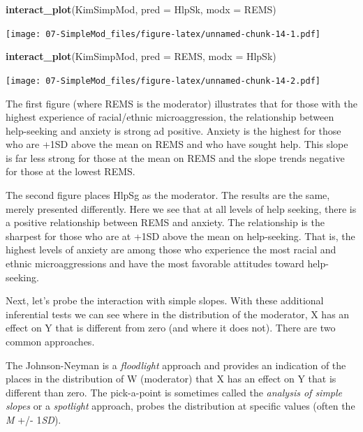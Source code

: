 \documentclass[
  11pt,
]{book}
\newenvironment{Shaded}{\begin{snugshade}}{\end{snugshade}}
\newcommand{\AttributeTok}[1]{\textcolor[rgb]{0.27,0.27,0.27}{#1}}
\newcommand{\FunctionTok}[1]{\textcolor[rgb]{0.27,0.27,0.27}{\textbf{#1}}}
\newcommand{\NormalTok}[1]{#1}
\begin{document}
\begin{Shaded}
\begin{Highlighting}[]
\FunctionTok{interact\_plot}\NormalTok{(KimSimpMod, }\AttributeTok{pred =}\NormalTok{ HlpSk, }\AttributeTok{modx =}\NormalTok{ REMS)}
\end{Highlighting}
\end{Shaded}

\texttt{[image: 07-SimpleMod\_files/figure-latex/unnamed-chunk-14-1.pdf]}

\begin{Shaded}
\begin{Highlighting}[]
\FunctionTok{interact\_plot}\NormalTok{(KimSimpMod, }\AttributeTok{pred =}\NormalTok{ REMS, }\AttributeTok{modx =}\NormalTok{ HlpSk)}
\end{Highlighting}
\end{Shaded}

\texttt{[image: 07-SimpleMod\_files/figure-latex/unnamed-chunk-14-2.pdf]}

The first figure (where REMS is the moderator) illustrates that for those with the highest experience of racial/ethnic microaggression, the relationship between help-seeking and anxiety is strong ad positive. Anxiety is the highest for those who are +1SD above the mean on REMS and who have sought help. This slope is far less strong for those at the mean on REMS and the slope trends negative for those at the lowest REMS.

The second figure places HlpSg as the moderator. The results are the same, merely presented differently. Here we see that at all levels of help seeking, there is a positive relationship between REMS and anxiety. The relationship is the sharpest for those who are at +1SD above the mean on help-seeking. That is, the highest levels of anxiety are among those who experience the most racial and ethnic microaggressions and have the most favorable attitudes toward help-seeking.

Next, let's probe the interaction with simple slopes. With these additional inferential tests we can see where in the distribution of the moderator, X has an effect on Y that is different from zero (and where it does not). There are two common approaches.

The Johnson-Neyman is a \emph{floodlight} approach and provides an indication of the places in the distribution of W (moderator) that X has an effect on Y that is different than zero. The pick-a-point is sometimes called the \emph{analysis of simple slopes} or a \emph{spotlight} approach, probes the distribution at specific values (often the \emph{M} +/- 1\emph{SD}).
\end{document}
